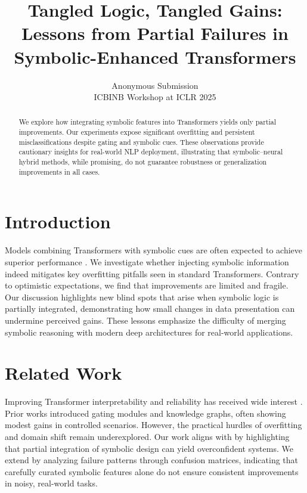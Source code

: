 \documentclass{article}
\begin{document}
\title{Tangled Logic, Tangled Gains: Lessons from Partial Failures in Symbolic-Enhanced Transformers}
\author{
    Anonymous Submission \\
    ICBINB Workshop at ICLR 2025
}
\date{}
\maketitle

\begin{abstract}
We explore how integrating symbolic features into Transformers yields only partial improvements. Our experiments expose significant overfitting and persistent misclassifications despite gating and symbolic cues. These observations provide cautionary insights for real-world NLP deployment, illustrating that symbolic–neural hybrid methods, while promising, do not guarantee robustness or generalization improvements in all cases.
\end{abstract}

\section{Introduction}
Models combining Transformers with symbolic cues are often expected to achieve superior performance \citep{wang2020,he2021}. We investigate whether injecting symbolic information indeed mitigates key overfitting pitfalls seen in standard Transformers. Contrary to optimistic expectations, we find that improvements are limited and fragile. Our discussion highlights new blind spots that arise when symbolic logic is partially integrated, demonstrating how small changes in data presentation can undermine perceived gains. These lessons emphasize the difficulty of merging symbolic reasoning with modern deep architectures for real-world applications.

\section{Related Work}
Improving Transformer interpretability and reliability has received wide interest \citep{smith2022}. Prior works introduced gating modules and knowledge graphs, often showing modest gains in controlled scenarios. However, the practical hurdles of overfitting and domain shift remain underexplored. Our work aligns with \citet{wang2020} by highlighting that partial integration of symbolic design can yield overconfident systems. We extend \citet{he2021} by analyzing failure patterns through confusion matrices, indicating that carefully curated symbolic features alone do not ensure consistent improvements in noisy, real-world tasks.
\end{document}
